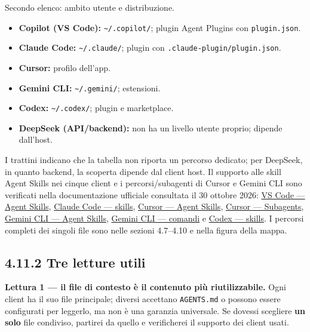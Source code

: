 \documentclass[
  italian,
  10pt,
]{book}
\providecommand{\tightlist}{%
  \setlength{\itemsep}{0pt}\setlength{\parskip}{0pt}}
\begin{document}
Secondo elenco: ambito utente e distribuzione.

\begin{itemize}
\tightlist
\item
  \textbf{Copilot (VS Code):} \texttt{\textasciitilde{}/.copilot/};
  plugin Agent Plugins con \texttt{plugin.json}.
\item
  \textbf{Claude Code:} \texttt{\textasciitilde{}/.claude/}; plugin con
  \texttt{.claude-plugin/plugin.json}.
\item
  \textbf{Cursor:} profilo dell'app.
\item
  \textbf{Gemini CLI:} \texttt{\textasciitilde{}/.gemini/}; estensioni.
\item
  \textbf{Codex:} \texttt{\textasciitilde{}/.codex/}; plugin e
  marketplace.
\item
  \textbf{DeepSeek (API/backend):} non ha un livello utente proprio;
  dipende dall'host.
\end{itemize}

I trattini indicano che la tabella non riporta un percorso dedicato; per
DeepSeek, in quanto backend, la scoperta dipende dal client host. Il
supporto alle skill Agent Skills nei cinque client e i
percorsi/subagenti di Cursor e Gemini CLI sono verificati nella
documentazione ufficiale consultata il 30 ottobre 2026:
\href{https://code.visualstudio.com/docs/agent-customization/agent-skills}{VS
Code --- Agent Skills},
\href{https://code.claude.com/docs/en/skills}{Claude Code --- skills},
\href{https://cursor.com/docs/skills}{Cursor --- Agent Skills},
\href{https://cursor.com/docs/subagents}{Cursor --- Subagents},
\href{https://geminicli.com/docs/cli/skills/}{Gemini CLI --- Agent
Skills}, \href{https://geminicli.com/docs/reference/commands/}{Gemini
CLI --- comandi} e
\href{https://developers.openai.com/codex/skills/}{Codex --- skills}. I
percorsi completi dei singoli file sono nelle sezioni 4.7--4.10 e nella
figura della mappa.

\subsection{4.11.2 Tre letture utili}\label{tre-letture-utili}

\textbf{Lettura 1 --- il file di contesto è il contenuto più
riutilizzabile.} Ogni client ha il suo file principale; diversi
accettano \texttt{AGENTS.md} o possono essere configurati per leggerlo,
ma non è una garanzia universale. Se dovessi scegliere \textbf{un solo}
file condiviso, partirei da quello e verificherei il supporto dei client
usati.
\end{document}
